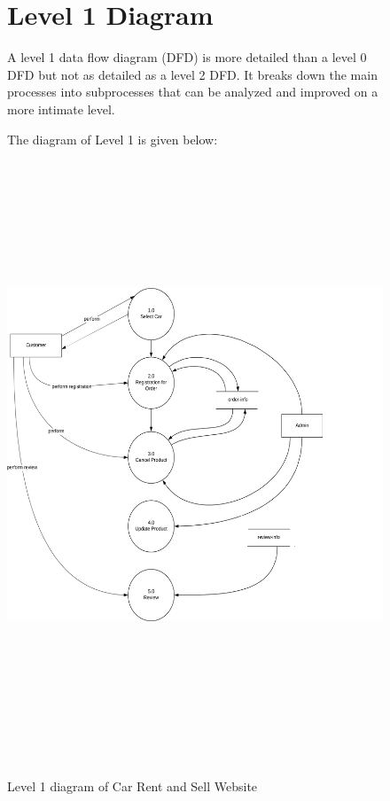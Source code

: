 \begin{figure}


\section{Level 1 Diagram}

\noindent A level 1 data flow diagram (DFD) is more detailed than a level 0 DFD but not as detailed as a level 2 DFD. It breaks down the main processes into subprocesses that can be analyzed and improved on a more intimate level.

\noindent The diagram of Level 1 is given below:\\


\noindent \includegraphics[width=5.50in, height=7.21in, keepaspectratio=false]{figures/C1}

\noindent 

\caption{Level 1 diagram of Car Rent and Sell Website}


\end{figure}


